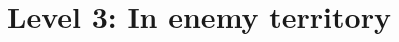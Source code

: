 \documentclass[12pt]{report}
\begin{document}


\tableofcontents

%
%
%
%
%
%
%
%
%
%

\part{Level 3: In enemy territory}











%
%
%  
%  
%
%  
%  
%
\end{document}
